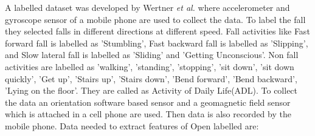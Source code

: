 \vspace{0.5cm}
 A labelled dataset was developed by Wertner \emph{et al.} \cite{wertner_open_2015} where accelerometer and gyroscope sensor of a mobile phone are used to collect the data. To label the fall they selected falls in different directions at different speed. Fall activities like Fast forward fall is labelled as 'Stumbling', Fast backward fall is labelled as 'Slipping', and Slow lateral fall is labelled as 'Sliding' and 'Getting Unconscious'. Non fall activities are labelled as 'walking', 'standing', 'stopping', 'sit down', 'sit down quickly', 'Get up', 'Stairs up', 'Stairs down', 'Bend forward', 'Bend backward', 'Lying on the floor'. They are called as Activity of Daily Life(ADL). To collect the data an orientation software based sensor and a geomagnetic field sensor which is attached in a cell phone are used.  Then data is also recorded by the mobile phone. Data needed to extract features of Open labelled are:

